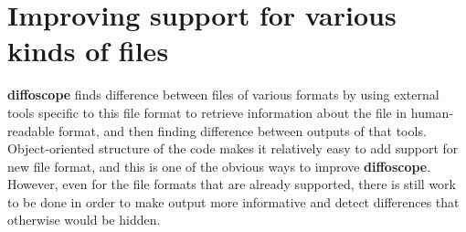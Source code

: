 \section{Improving support for various kinds of files}

\textbf{diffoscope} finds difference between files of various formats by using external
tools specific to this file format to retrieve information about the file in
human-readable format, and then finding difference between outputs of that tools.
Object-oriented structure of the code makes it relatively easy to add support for 
new file format, and this is one of the obvious ways to improve \textbf{diffoscope}.\\
However, even for the file formats that are already supported, there is still work 
to be done in order to make output more informative and detect differences that
otherwise would be hidden.\\

